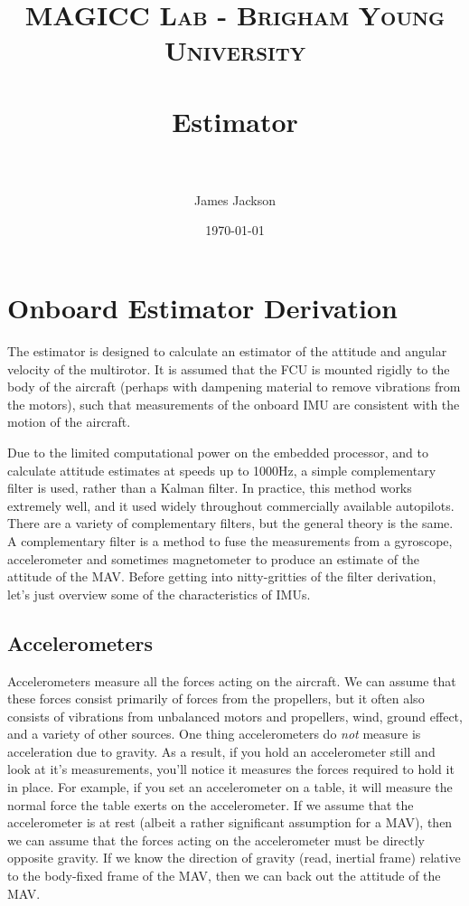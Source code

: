\documentclass[paper=a4, fontsize=11pt]{scrartcl} %
\title{
\normalfont \normalsize
\textsc{MAGICC Lab - Brigham Young University} \\ [25pt] %
\horrule{0.5pt} \\[0.4cm] %
\huge Estimator \\ %
\horrule{2pt} \\[0.5cm] %
}
\author{James Jackson} %
\date{\normalsize\today} %
\numberwithin{equation}{section} %
\numberwithin{figure}{section} %
\numberwithin{table}{section} %
\begin{document}
\maketitle %


\section{Onboard Estimator Derivation}

The estimator is designed to calculate an estimator of the attitude and angular velocity of the multirotor.  It is assumed that the FCU is mounted rigidly to the body of the aircraft (perhaps with dampening material to remove vibrations from the motors), such that measurements of the onboard IMU are consistent with the motion of the aircraft.

Due to the limited computational power on the embedded processor, and to calculate attitude estimates at speeds up to 1000Hz, a simple complementary filter is used, rather than a Kalman filter.  In practice, this method works extremely well, and it used widely throughout commercially available autopilots.  There are a variety of complementary filters, but the general theory is the same.  A complementary filter is a method to fuse the measurements from a gyroscope, accelerometer and sometimes magnetometer to produce an estimate of the attitude of the MAV.  Before getting into nitty-gritties of the filter derivation, let's just overview some of the characteristics of IMUs.

\subsection{Accelerometers}

Accelerometers measure all the forces acting on the aircraft.  We can assume that these forces consist primarily of forces from the propellers, but it often also consists of vibrations from unbalanced motors and propellers, wind, ground effect, and a variety of other sources. One thing accelerometers do \textit{not} measure is acceleration due to gravity.  As a result, if you hold an accelerometer still and look at it's measurements, you'll notice it measures the forces required to hold it in place.  For example, if you set an accelerometer on a table, it will measure the normal force the table exerts on the accelerometer.  If we assume that the accelerometer is at rest (albeit a rather significant assumption for a MAV), then we can assume that the forces acting on the accelerometer must be directly opposite gravity.  If we know the direction of gravity (read, inertial frame) relative to the body-fixed frame of the MAV, then we can back out the attitude of the MAV.  
\end{document}
